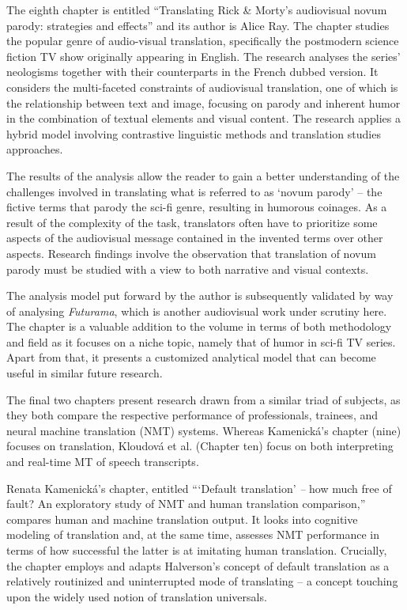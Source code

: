 \documentclass[output=paper]{langscibook}
\begin{document}
The eighth chapter is entitled “Translating Rick \& Morty’s audiovisual novum parody: strategies and effects” and its author is Alice Ray. The chapter studies the popular genre of audio-visual translation, specifically the postmodern science fiction TV show originally appearing in English. The research analyses the series’ neologisms together with their counterparts in the French dubbed version. It considers the multi-faceted constraints of audiovisual translation, one of which is the relationship between text and image, focusing on parody and inherent humor in the combination of textual elements and visual content. The research applies a hybrid model involving contrastive linguistic methods and translation studies approaches.

The results of the analysis allow the reader to gain a better understanding of the challenges involved in translating what is referred to as ‘novum parody’ – the fictive terms that parody the sci-fi genre, resulting in humorous coinages. As a result of the complexity of the task, translators often have to prioritize some aspects of the audiovisual message contained in the invented terms over other aspects. Research findings involve the observation that translation of novum parody must be studied with a view to both narrative and visual contexts.

The analysis model put forward by the author is subsequently validated by way of analysing \textit{Futurama}, which is another audiovisual work under scrutiny here. The chapter is a valuable addition to the volume in terms of both methodology and field as it focuses on a niche topic, namely that of humor in sci-fi TV series. Apart from that, it presents a customized analytical model that can become useful in similar future research.

The final two chapters present research drawn from a similar triad of subjects, as they both compare the respective performance of professionals, trainees, and neural machine translation (NMT) systems. Whereas Kamenická’s chapter (nine) focuses on translation, Kloudová et al. (Chapter ten) focus on both interpreting and real-time MT of speech transcripts.

Renata Kamenická’s chapter, entitled “‘Default translation’ \textit{–} how much free of fault? An exploratory study of NMT and human translation comparison,” compares human and machine translation output. It looks into cognitive modeling of translation and, at the same time, assesses NMT performance in terms of how successful the latter is at imitating human translation. Crucially, the chapter employs and adapts Halverson’s concept of default translation as a relatively routinized and uninterrupted mode of translating – a concept touching upon the widely used notion of translation universals.
\end{document}
